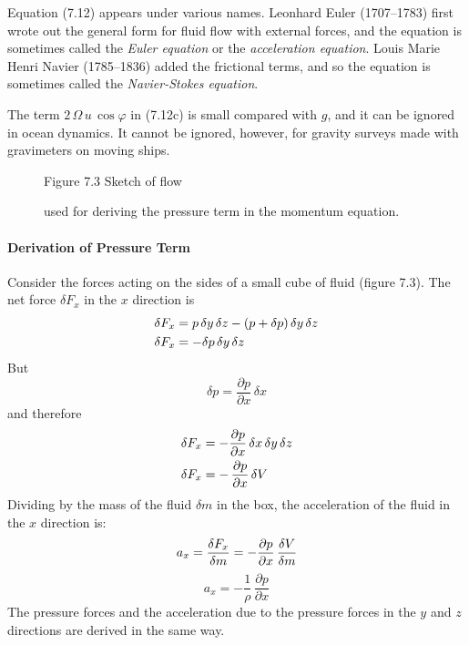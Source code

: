 Equation (7.12) appears under various names. Leonhard Euler
(1707--1783) first wrote out the general form for fluid flow with
external forces, and the equation is sometimes called the
\textit{Euler equation} or the
\textit{acceleration equation}. Louis
Marie Henri Navier (1785--1836) added the frictional terms, and so the
equation is sometimes called the \textit{Navier-Stokes
  equation}.

The term $2\,\Omega\,u\, \cos{\varphi}$ in (7.12c) is small compared
with $g$, and it can be ignored in ocean dynamics. It cannot be
ignored, however, for gravity surveys made with gravimeters on moving
ships.

\begin{figure}[h!]
\centering
\footnotesize
Figure 7.3 Sketch of flow \rule{0mm}{3ex}used for deriving the
pressure term in the momentum equation.

\label{fig:pressuresketch}
\vspace{-3ex}
\end{figure}

\paragraph{Derivation of Pressure Term}
Consider the forces acting on the sides of a small cube of fluid
(figure 7.3).  The net force $\delta F_x$ in the $x$ direction is
\begin{align}
\delta F_x &= p\,\delta{y}\,\delta{z} - (p + \delta{p})\,\delta{y}\,\delta{z}
\notag \\
\delta F_x &= - \delta{p}\,\delta{y}\,\delta{z} \notag
\end{align}
But
\begin{displaymath}
\delta{p} = \frac{\partial{p}}{\partial{x}}\,\delta{x}
\end{displaymath}
and therefore
\begin{align}
\delta F_x &= - \frac{\partial{p}}{\partial{x}}\,\delta{x}\,\delta{y}\,\delta{z}
\notag \\
\delta F_x &=-\,\frac{\partial{p}}{\partial{x}}\, \delta{V} \notag
\end{align}
Dividing by the mass of the fluid $\delta m$ in the box, the
acceleration of the fluid in the $x$ direction is:
\begin{equation}
a_x = \frac{{\delta F_x}}{\delta{m}} = - \frac{\partial{p}}{\partial{x}}\,
\frac{\delta{V}}{\delta{m}} \notag
\end{equation}
\begin{equation}
\boxed{a_x = - \frac{1}{\rho}\,\frac{\partial{p}}{\partial{x}}}
\end{equation}
The pressure forces and the acceleration due to the pressure forces in the $y$
and
$z$ directions are derived in the same way.

